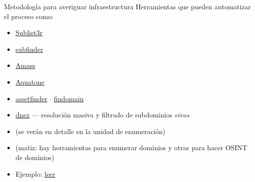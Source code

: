 \documentclass[aspectratio=169,11pt]{beamer}
\begin{document}
\begin{frame}[allowframebreaks]{Metodología para averiguar infraestructura}
\small
Herramientas que pueden automatizar el proceso como:
  \begin{itemize}
  \item \href{https://github.com/aboul3la/Sublist3r}{Sublist3r}
    \item \href{https://github.com/projectdiscovery/subfinder}{subfinder}
    \item \href{https://github.com/owasp-amass/amass}{Amass}
    \item \href{https://github.com/michenriksen/aquatone}{Aquatone}
    \item \href{https://github.com/tomnomnom/assetfinder}{assetfinder} $\cdot$ \href{https://github.com/findomain/findomain}{findomain}
    \item \href{https://github.com/projectdiscovery/dnsx}{dnsx} --- resolución masiva y filtrado de subdominios \emph{vivos}
    \item (se verán en detalle en la unidad de enumeración)
    \item (matiz: hay herramientas para enumerar dominios y otras para hacer OSINT de dominios)
  \item Ejemplo: \href{https://fwhibbit.es/wh01p-que-hay-detras-de-esa-ip}{leer}
  \end{itemize}
\end{frame}
\end{document}
